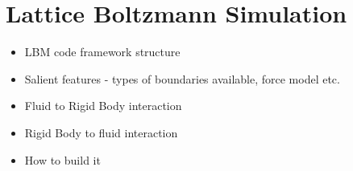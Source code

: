 \section{Lattice Boltzmann Simulation}
\begin{itemize}
	\item LBM code framework structure
	\item Salient features - types of boundaries available, force model etc.
	\item Fluid to Rigid Body interaction
	\item Rigid Body to fluid interaction
	\item How to build it
\end{itemize}